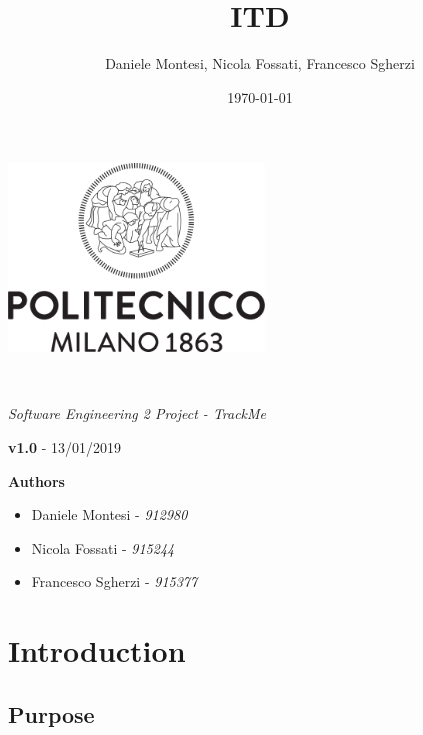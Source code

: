 \documentclass[a4paper,oneside,11pt]{article}
\title{ITD}
\author{Daniele Montesi, Nicola Fossati, Francesco Sgherzi}
\date{\today}
\begin{document}
    \begin{titlingpage} 
        \begin{center}
            \includegraphics[height=5cm]{assets/Logo_Politecnico_Milano.png}\\
            \vspace{4cm}
            \begin{huge} 
                \textbf{\thetitle} \\
            \end{huge}
            \vspace{0.3cm}
                    \begin{Large}
                \textit{Software Engineering 2 Project - TrackMe} \\
            \end{Large}
        \end{center}
         \textbf{v1.0} - 13/01/2019 \\

            \vspace{4cm}
             \begin{large}
            \textbf{Authors}
            \begin{itemize}
                \item Daniele Montesi - \textit{912980} 
                \item Nicola Fossati - \textit{915244}
                \item Francesco Sgherzi - \textit{915377}
            \end{itemize}
        \end{large}
    \end{titlingpage}
    \newpage
    \tableofcontents
    \newpage
    \section{Introduction}
    
        \subsection{Purpose}
            
\end{document}

